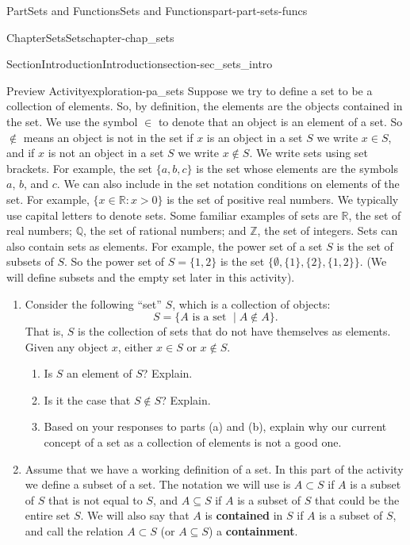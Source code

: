 \documentclass[oneside,10pt,]{book}
\newcommand{\terminology}[1]{\textbf{#1}}
\numberwithin{equation}{chapter}
\newcommand{\Z}{\mathbb{Z}}
\newcommand{\Q}{\mathbb{Q}}
\newcommand{\R}{\mathbb{R}}
\newcommand{\gt}{>}
\begin{document}
\begin{partptx}{Part}{Sets and Functions}{}{Sets and Functions}{}{}{part-part-sets-funcs}
\begin{chapterptx}{Chapter}{Sets}{}{Sets}{}{}{chapter-chap_sets}
\begin{sectionptx}{Section}{Introduction}{}{Introduction}{}{}{section-sec_sets_intro}
\begin{exploration}{Preview Activity}{}{exploration-pa_sets}
Suppose we try to define a set to be a collection of elements. So, by definition, the elements are the objects contained in the set. We use the symbol \(\in\) to denote that an object is an element of a set. So \(\notin\) means an object is not in the set \textemdash{} if \(x\) is an object in a set \(S\) we write \(x \in S\), and if \(x\) is not an object in a set \(S\) we write \(x \notin S\). We write sets using set brackets. For example, the set \(\{a,b,c\}\) is the set whose elements are the symbols \(a\), \(b\), and \(c\). We can also include in the set notation conditions on elements of the set. For example, \(\{x \in \R : x \gt 0\}\) is the set of positive real numbers. We typically use capital letters to denote sets. Some familiar examples of sets are \(\R\), the set of real numbers; \(\Q\), the set of rational numbers; and \(\Z\), the set of integers. Sets can also contain sets as elements. For example, the power set of a set \(S\) is the set of subsets of \(S\). So the power set of \(S = \{1,2\}\) is the set \(\{\emptyset, \{1\}, \{2\}, \{1,2\}\}\). (We will define subsets and the empty set later in this activity).%
\begin{enumerate}[font=\bfseries,label=(\alph*),ref=\alph*]%
\item{}Consider the following ``set'' \(S\), which is a collection of objects:%
\begin{equation*}
S = \{A \text{ is a set }  \mid A \notin A\}\text{.}
\end{equation*}
That is, \(S\) is the collection of sets that do not have themselves as elements. Given any object \(x\), either \(x \in S\) or \(x \notin S\).%
\begin{enumerate}[font=\bfseries,label=(\roman*),ref=\theenumi.\roman*]%
\item{}Is \(S\) an element of \(S\)? Explain.%
\item{}Is it the case that \(S \notin S\)? Explain.%
\item{}Based on your responses to parts (a) and (b), explain why our current concept of a set as a collection of elements is not a good one.%
\end{enumerate}%
\item{}Assume that we have a working definition of a set. In this part of the activity we define a subset of a set. The notation we will use is \(A \subset S\) if \(A\) is a subset of \(S\) that is not equal to \(S\), and \(A \subseteq S\) if \(A\) is a subset of \(S\) that could be the entire set \(S\). We will also say that \(A\) is \terminology{contained} in \(S\) if \(A\) is a subset of \(S\), and call the relation \(A \subset S\) (or \(A \subseteq S\)) a \terminology{containment}.%

\end{enumerate}
\end{exploration}
\end{sectionptx}
\end{chapterptx}
\end{partptx}
\end{document}
